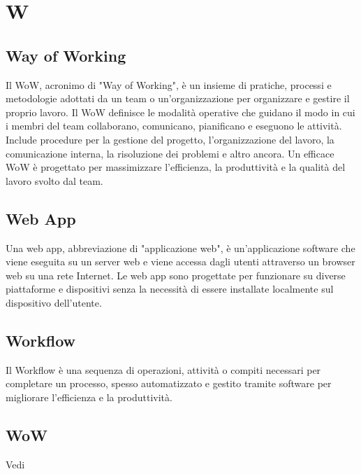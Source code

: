 \section{W}

\vspace{2em}
\subsection*{Way of Working}
Il WoW, acronimo di "Way of Working", è un insieme di pratiche, processi e metodologie adottati da un team o un'organizzazione per organizzare e gestire il proprio lavoro. Il WoW definisce le modalità operative che guidano il modo in cui i membri del team collaborano, comunicano, pianificano e eseguono le attività. Include procedure per la gestione del progetto, l'organizzazione del lavoro, la comunicazione interna, la risoluzione dei problemi e altro ancora. Un efficace WoW è progettato per massimizzare l'efficienza, la produttività e la qualità del lavoro svolto dal team.

\vspace{2em}
\subsection*{Web App}
Una web app, abbreviazione di "applicazione web", è un'applicazione software che viene eseguita su un server web e viene accessa dagli utenti attraverso un browser web su una rete Internet. Le web app sono progettate per funzionare su diverse piattaforme e dispositivi senza la necessità di essere installate localmente sul dispositivo dell'utente.

\vspace{2em}
\subsection*{Workflow}
Il Workflow è una sequenza di operazioni, attività o compiti necessari per completare un processo, spesso automatizzato e gestito tramite software per migliorare l'efficienza e la produttività.

\vspace{2em}
\subsection*{WoW}
\par Vedi 
